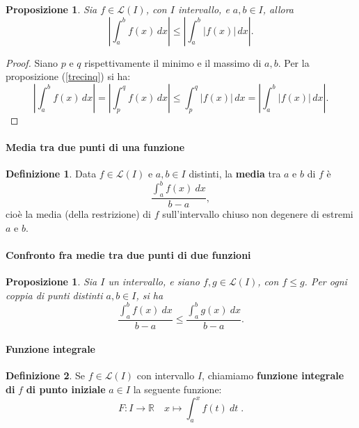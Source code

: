 \documentclass{article}
\theoremstyle{plain}
\newtheorem{prop}[thm]{Proposizione}
\theoremstyle{definition}
\newtheorem{defn}{Definizione}[section]
\theoremstyle{remark}
\begin{document}
\vspace{10pt}

\begin{bxthm}
\begin{prop}
    Sia $f\in\mathcal{L}(I)$, con $I$ intervallo, e $a,b\in I$, allora 
    \[\left|\int_{a}^{b}f(x)\,dx\right|\leq\left|\int_{a}^{b}|f(x)|\,dx\right|.\]
\end{prop}
\end{bxthm}
\begin{proof}
    Siano $p$ e $q$ rispettivamente il minimo e il massimo di ${a,b}$. Per la proposizione (\ref{trecinq}) si ha:
    \[\left|\int_{a}^{b}f(x)\,dx\right|=\left|\int_{p}^{q}f(x)\,dx\right|\leq \int_{p}^{q}|f(x)|\,dx = \left|\int_{a}^{b}|f(x)|\,dx\right|.\]
\end{proof}

\vspace{10pt}

\paragraph{Media tra due punti di una funzione}
\begin{bxthm}
\begin{defn}
    Data $f\in\mathcal{L}(I)$ e $a,b\in I$ distinti, la \textbf{media} tra $a$ e $b$ di $f$ è 
    \[\dfrac{\int_{a}^{b}f(x)\ dx}{b-a},\]
    cioè la media (della restrizione) di $f$ sull'intervallo chiuso non degenere di estremi $a$ e $b$.
\end{defn}
\end{bxthm}

\vspace{10pt}

\paragraph{Confronto fra medie tra due punti di due funzioni}
\begin{bxthm}
\begin{prop}
    Sia $I$ un intervallo, e siano $f,g\in\mathcal{L}(I)$, con $f\leq g$. Per ogni coppia di punti distinti $a,b\in I$, si ha 
    \[\dfrac{\int_{a}^{b}f(x)\ dx}{b-a}\leq\dfrac{\int_{a}^{b}g(x)\ dx}{b-a}.\]
\end{prop}
\end{bxthm}

\vspace{10pt}

\paragraph{Funzione integrale}
\begin{bxthm}
\begin{defn}
    Se $f\in\mathcal{L}(I)$ con intervallo $I$, chiamiamo \textbf{funzione integrale di} $f$ \textbf{di punto iniziale} $a\in I$ la seguente funzione:
    \[ F:I\to\mathbb{R}\quad x\mapsto \int_{a}^{x}f(t) \ dt\;. \]
\end{defn}
\end{bxthm}
\end{document}
